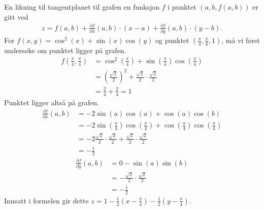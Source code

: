 \documentclass[11pt, a4paper, norsk]{NTNUoving}
\begin{document}
\begin{oppgave}
    En likning til tangentplanet til grafen en funksjon $f$ i punktet $(a,b, f(a,b))$ er gitt ved   
    \begin{align*}
      z = f(a,b) + \frac{\partial f}{\partial x}(a,b)\cdot(x-a) + \frac{\partial f}{\partial y}(a,b)\cdot(y-b).
    \end{align*}
    For $f(x,y) = \cos^2(x)+\sin(x)\cos(y)$ og punktet $(\frac{\pi}{4}, \frac{\pi}{4}, 1)$, må vi først undersøke om punktet ligger på grafen. 
    \begin{align*}
        f\left(\frac{\pi}{4}, \frac{\pi}{4}\right) &= \cos^2\left(\frac{\pi}{4}\right) + \sin\left(\frac{\pi}{4}\right)\cos\left(\frac{\pi}{4}\right)
        \\&= \left(\frac{\sqrt{2}}{2}\right)^2 + \frac{\sqrt{2}}{2} \cdot \frac{\sqrt{2}}{2}
        \\&=\frac{2}{4}+\frac{2}{4} = 1
    \end{align*}
    Punktet ligger altså på grafen. 
    \begin{align*}
        \frac{\partial f}{\partial x}(a,b) &= -2\sin(a)\cos(a) + \cos(a)\cos(b)
        \\&= -2\sin\left(\frac{\pi}{4}\right)\cos\left(\frac{\pi}{4}\right) + \cos\left(\frac{\pi}{4}\right)\cos\left(\frac{\pi}{4}\right)
        \\&= -2\frac {\sqrt{2}}{2}\cdot \frac{\sqrt{2}}{2} + \frac{\sqrt{2}}{2} \cdot \frac{\sqrt{2}}{2}
        \\&= -\frac{1}{2}
    \end{align*}
    \begin{align*}
        \frac{\partial f}{\partial y}(a,b) &= 0 -\sin(a)\sin(b)
        \\&= -\frac{\sqrt{2}}{2} \cdot \frac{\sqrt{2}}{2}
        \\&= -\frac{1}{2}
    \end{align*}
    Innsatt i formelen gir dette $z=1-\frac{1}{2}(x-\frac{\pi}{4}) -\frac{1}{2}(y-\frac{\pi}{4})$.
\end{oppgave}
\end{document}
